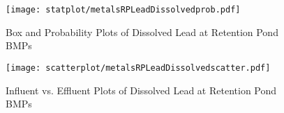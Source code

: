        \begin{figure}[hb]   %
            \centering
            \texttt{[image: statplot/metalsRPLeadDissolvedprob.pdf]}
            \caption{Box and Probability Plots of Dissolved Lead at Retention Pond BMPs}
        \end{figure}         %
        
        
        \begin{figure}[hb]   %
            \centering
            \texttt{[image: scatterplot/metalsRPLeadDissolvedscatter.pdf]}
            \caption{Influent vs. Effluent Plots of Dissolved Lead at Retention Pond BMPs}
        \end{figure}         %
        \clearpage
        